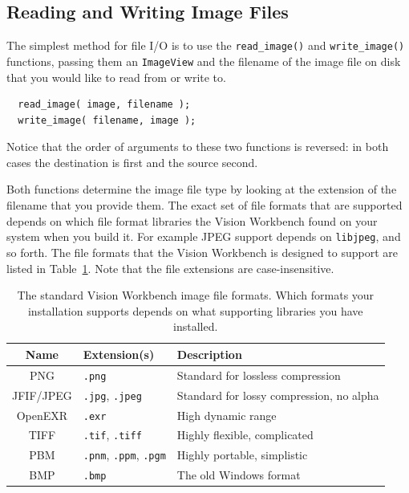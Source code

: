\subsection{Reading and Writing Image Files}

The simplest method for file I/O is to use the \verb#read_image()# and 
\verb #write_image()# functions, passing them an \verb#ImageView# and 
the filename of the image file on disk that you would like to read from 
or write to.
\begin{verbatim}
  read_image( image, filename );
  write_image( filename, image );
\end{verbatim}
Notice that the order of arguments to these two functions is reversed: 
in both cases the destination is first and the source second.

Both functions determine the image file type by looking at the 
extension of the filename that you provide them.  The exact set of 
file formats that are supported depends on which file format libraries 
the Vision Workbench found on your system when you build it.  For 
example JPEG support depends on \verb#libjpeg#, and so forth.  The 
file formats that the Vision Workbench is designed to support are 
listed in Table~\ref{tbl:file-formats}.  Note that the file extensions 
are case-insensitive.

\begin{table}[t]\begin{centering}
\begin{tabular}{|c|l|l|} \hline
Name & Extension(s) & Description \\ \hline \hline
PNG & \verb#.png# & Standard for lossless compression \\ \hline
JFIF/JPEG & \verb#.jpg#, \verb#.jpeg# & Standard for lossy compression, no alpha \\ \hline
OpenEXR & \verb#.exr# & High dynamic range \\ \hline
TIFF & \verb#.tif#, \verb#.tiff# & Highly flexible, complicated \\ \hline
PBM & \verb#.pnm#, \verb#.ppm#, \verb#.pgm# & Highly portable, simplistic \\ \hline
BMP & \verb#.bmp# & The old Windows format \\ \hline
\end{tabular}
\caption{The standard Vision Workbench image file formats.  Which formats 
your installation supports depends on what supporting libraries you have installed.}
\label{tbl:file-formats}
\end{centering}\end{table}

